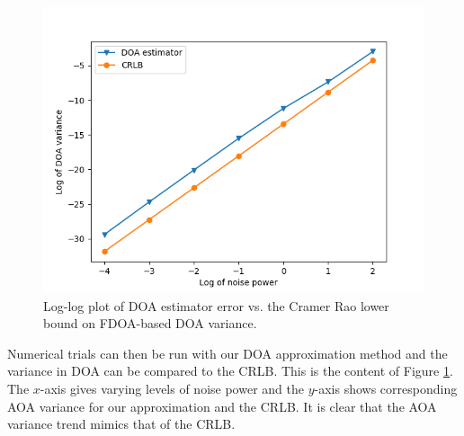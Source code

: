 \begin{figure}
  \includegraphics[scale=0.8]{CRLBcompare1}
  \caption{Log-log plot of DOA estimator error vs. the Cramer Rao lower bound on FDOA-based DOA variance. }
  \label{CRLB}
\end{figure}

Numerical trials can then be run with our DOA approximation method and the variance in DOA can be compared to the CRLB. This is the content of Figure \ref{CRLB}. The $x$-axis gives varying levels of noise power and the $y$-axis shows corresponding AOA variance for our approximation and the CRLB. It is clear that the AOA variance trend mimics that of the CRLB.
